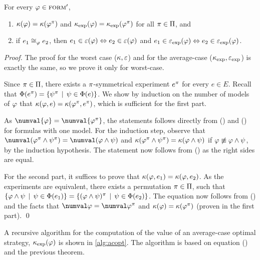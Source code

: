 \begin{theorem}
For every $\varphi\in{\textsc{form}'}$,
\begin{enumerate}
\item $\kappa(\varphi) = \kappa(\varphi^\pi)$ and $\kappa_\textrm{exp}(\varphi) = \kappa_\textrm{exp}(\varphi^\pi)$ for all $\pi\in\Pi$, and
\item if $e_1\cong_{\varphi} e_2$, then $e_1\in\varepsilon(\varphi) \Leftrightarrow e_2\in\varepsilon(\varphi)$ and
  $e_1\in\varepsilon_\textrm{exp}(\varphi) \Leftrightarrow e_2\in\varepsilon_\textrm{exp}(\varphi)$.
\end{enumerate}
\end{theorem}

\begin{proof}
The proof for the worst case ($\kappa, \varepsilon$)
  and for the average-case ($\kappa_\textrm{exp}, \varepsilon_\textrm{exp}$) is exactly the same,
  so we prove it only for worst-case.

Since $\pi\in\Pi$, there exists a $\pi$-symmetrical experiment $e^\pi$
  for every $e\in E$.
Recall that $\Phi(e^\pi) = \{ \psi^\pi \:\:|\:\: \psi\in\Phi(e)\}$.
We show by induction on the number of models of $\varphi$
  that $\kappa(\varphi, e) = \kappa(\varphi^\pi, e^\pi)$,
  which is sufficient for the first part.

As $\numval{\form} = \numval{\form^\perm}$, the statements follows directly from
  () and () for formulas with one model.
For the induction step, observe that
  $\numval(\form^\perm \wedge \formx^\perm) = \numval(\form\wedge\formx)$
  and
  $\kappa(\varphi^\pi \wedge \psi^\pi) = \kappa(\varphi\wedge\psi)$
  if $\varphi \not\equiv \varphi\wedge\psi$, by the induction hypothesis.
The statement now follows from ()
  as the right sides are equal.

For the second part, it suffices to prove that
  $\kappa(\varphi, e_1) = \kappa(\varphi, e_2)$.
As the experiments are equivalent, there exists a permutation $\pi\in\Pi$,
 such that
 $\{\varphi\wedge\psi \:\:|\:\:\psi\in\Phi(e_1)\} =
 \{(\varphi\wedge\psi)^\pi \:\:|\:\:\psi\in\Phi(e_2)\}$.
The equation now follows from () and the facts that
 $\numval\form=\numval\form^\perm$ and $\kappa(\varphi) = \kappa(\varphi^\pi)$
 (proven in the first part). \qed
\end{proof}

A recursive algorithm for the computation of the value
  of an average-case optimal strategy,
  $\kappa_\textrm{exp}(\varphi)$ is shown in \autoref{alg:acopt}.
The algorithm is based on equation () and
  the previous theorem.

